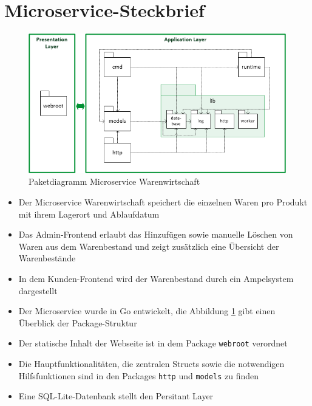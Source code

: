 \section{Microservice-Steckbrief}
\label{sec: Microservice-Steckbrief}

\begin{figure}[H]
	\begin{center}
	\includegraphics[width=0.95 \textwidth]{./pics/struktur.png}
	\end{center}
	\caption{Paketdiagramm Microservice Warenwirtschaft}
	\label{pic: Microservice Warenwirtschaft}
\end{figure}


\begin{itemize}
	\item Der Microservice Warenwirtschaft speichert die einzelnen Waren pro Produkt mit ihrem Lagerort und Ablaufdatum
	\item Das Admin-Frontend erlaubt das Hinzufügen sowie manuelle Löschen von Waren aus dem Warenbestand und zeigt zusätzlich eine Übersicht der Warenbestände
	\item In dem Kunden-Frontend wird der Warenbestand durch ein Ampelsystem dargestellt
	\item Der Microservice wurde in Go entwickelt, die Abbildung \ref{pic: Microservice Warenwirtschaft} gibt einen Überblick der Package-Struktur
	\item Der statische Inhalt der Webseite ist in dem Package \texttt{webroot} verordnet
	\item Die Hauptfunktionalitäten, die zentralen Structs sowie die notwendigen Hilfsfunktionen sind in den Packages \texttt{http} und \texttt{models} zu finden
	\item Eine SQL-Lite-Datenbank stellt den Persitant Layer
\end{itemize}
